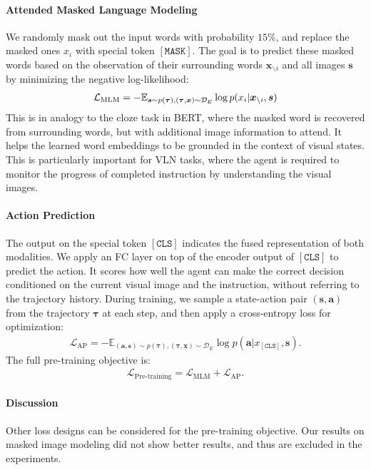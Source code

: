 \documentclass[10pt,twocolumn,letterpaper]{article}
\newcommand{\av}{{\boldsymbol{a}}}
\newcommand{\sv}{{\boldsymbol{s}}}
\newcommand{\xv}{\boldsymbol{x}}
\newcommand{\tauv}[0]{{\boldsymbol{\tau}}}
\newcommand{\E}{\mathbb{E}}
\newcommand{\Lcal}{\mathcal{L}}
\newcommand{\Dcal}{\mathcal{D}}
\begin{document}
\paragraph{Attended Masked Language Modeling} 
We randomly mask out the input words with probability $15\%$, and replace the masked ones $x_i$ with special token
 $\mathtt{[MASK]}$. The goal is to predict these masked words based on the observation of their surrounding
words $\xv_{\backslash i}$ and all images $\sv$ by minimizing the negative log-likelihood:
\begin{align} 
\hspace{-0mm}
\Lcal_{\text{MLM}} = -\E_{  \sv \sim p(\tauv),  (\tauv, \xv) \sim \Dcal_E } \log p( x_i | \xv_{\backslash i}, \sv )
\label{eq_attend_mlm}
\end{align}
This is in analogy to the cloze task in BERT, where the masked word is recovered from surrounding words, but with additional image information to attend. It helps the learned word embeddings to be grounded in the context of visual states. This is particularly important for VLN tasks, where the agent is required to monitor the progress of completed instruction by understanding the visual images.

\paragraph{Action Prediction} 
The output on the special token $\mathtt{[CLS]}$ indicates the fused representation of both modalities. We apply an FC layer on top of the encoder output of $\mathtt{[CLS]}$ to predict the action. It scores how well the agent can make the correct decision conditioned on the current visual image and the instruction, without referring to the trajectory history. During training, we sample a state-action pair $(\sv, \av)$ from the trajectory $\tauv$ at each step, and then apply a cross-entropy loss for optimization:
\begin{align}
\Lcal_{\text{AP}} = -\E_{ (\av, \sv) \sim p(\tauv), (\tauv, \xv) \sim \Dcal_E } \log p( \av | x_{ \mathtt{[CLS]}}, \sv ).
\label{eq_action_prediction}
\end{align}
The full pre-training objective is: 
\begin{align}
\Lcal_{\text{Pre-training}} = \Lcal_{\text{MLM}}  + \Lcal_{\text{AP}}. 
\label{eq_pre_training}
\end{align}



\paragraph{Discussion} Other loss designs can be considered for the pre-training objective. Our results on masked image modeling did not show better results, and thus are excluded in the experiments. 
\end{document}
